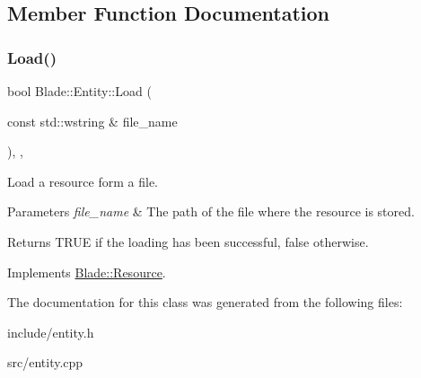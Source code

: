 \subsection{Member Function Documentation}
\mbox{\label{class_blade_1_1_entity_a1e23e9402a5c5a1d266c208c7637c539}} 
\subsubsection{\texorpdfstring{Load()}{Load()}}
{\footnotesize\ttfamily bool Blade\+::\+Entity\+::\+Load (\begin{DoxyParamCaption}\item[{const std\+::wstring \&}]{file\+\_\+name }\end{DoxyParamCaption})\hspace{0.3cm}{\ttfamily [override]}, {\ttfamily [virtual]}, {\ttfamily [noexcept]}}



Load a resource form a file. 


\begin{DoxyParams}{Parameters}
{\em file\+\_\+name} & The path of the file where the resource is stored. \\
\hline
\end{DoxyParams}
\begin{DoxyReturn}{Returns}
T\+R\+UE if the loading has been successful, false otherwise. 
\end{DoxyReturn}


Implements \hyperlink{class_blade_1_1_resource_ad89ab00a3b81df1338a8310ec92c5cff}{Blade\+::\+Resource}.



The documentation for this class was generated from the following files\+:\begin{DoxyCompactItemize}
\item 
include/entity.\+h\item 
src/entity.\+cpp\end{DoxyCompactItemize}
